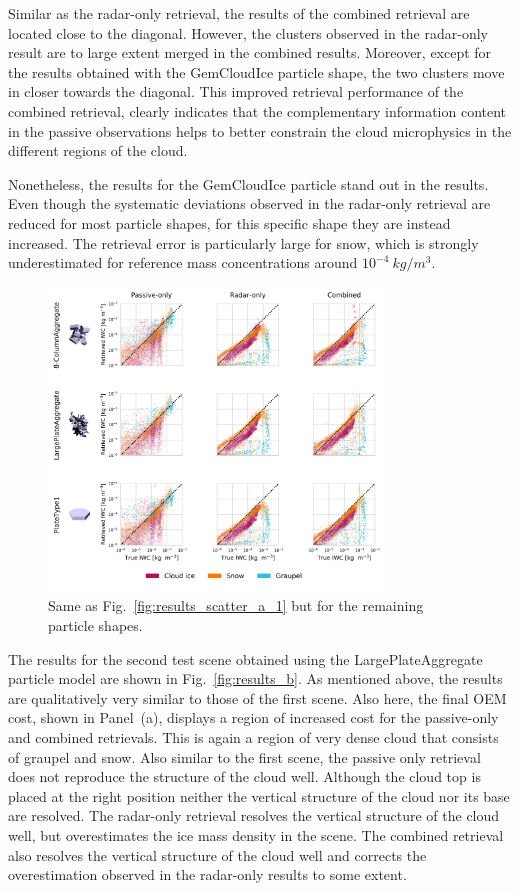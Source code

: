 \documentclass[journal abbreviation, manuscript]{copernicus}
\begin{document}
Similar as the radar-only retrieval, the results of the combined retrieval are
located close to the diagonal. However, the clusters observed in the radar-only
result are to large extent merged in the combined results. Moreover, except for
the results obtained with the GemCloudIce particle shape, the two clusters move
in closer towards the diagonal. This improved retrieval performance of the
combined retrieval, clearly indicates that the complementary information content in
the passive observations helps to better constrain the cloud microphysics in the
different regions of the cloud.

Nonetheless, the results for the GemCloudIce particle stand out in the results.
Even though the systematic deviations observed in the radar-only retrieval are
reduced for most particle shapes, for this specific shape they are instead
increased. The retrieval error is particularly large for snow, which is strongly
underestimated for reference mass concentrations around $10^{-4} \ \unit{kg/m^3}$.

\begin{figure}
\centering
\includegraphics[width = 0.8\textwidth]{../plots/results_scatter_a_2}
\caption{Same as Fig.~\ref{fig:results_scatter_a_1} but for the remaining particle
  shapes.}
\label{fig:results_scatter_a_2}
\end{figure}


The results for the second test scene obtained using the LargePlateAggregate
particle model are shown in Fig.~\ref{fig:results_b}. As mentioned above, the
results are qualitatively very similar to those of the first scene. Also here,
the final OEM cost, shown in Panel~(a), displays a region of increased cost for
the passive-only and combined retrievals. This is again a region of very dense
cloud that consists of graupel and snow. Also similar to the first scene, the
passive only retrieval does not reproduce the structure of the cloud well.
Although the cloud top is placed at the right position neither the vertical
structure of the cloud nor its base are resolved. The radar-only retrieval
resolves the vertical structure of the cloud well, but overestimates the ice
mass density in the scene. The combined retrieval also resolves the vertical
structure of the cloud well and corrects the overestimation observed in the
radar-only results to some extent.
\end{document}
